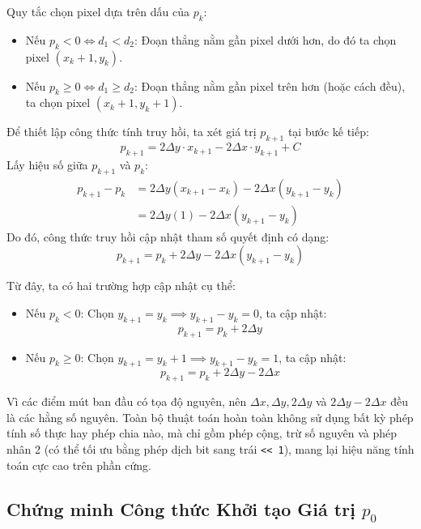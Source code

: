 Quy tắc chọn pixel dựa trên dấu của $p_k$:
\begin{itemize}
    \item Nếu $p_k < 0 \iff d_1 < d_2$: Đoạn thẳng nằm gần pixel dưới hơn, do đó ta chọn pixel $(x_k + 1, y_k)$.
    \item Nếu $p_k \ge 0 \iff d_1 \ge d_2$: Đoạn thẳng nằm gần pixel trên hơn (hoặc cách đều), ta chọn pixel $(x_k + 1, y_k + 1)$.
\end{itemize}

Để thiết lập công thức tính truy hồi, ta xét giá trị $p_{k+1}$ tại bước kế tiếp:
\begin{equation}
p_{k+1} = 2\Delta y \cdot x_{k+1} - 2\Delta x \cdot y_{k+1} + C
\end{equation}
Lấy hiệu số giữa $p_{k+1}$ và $p_k$:
\begin{align}
p_{k+1} - p_k &= 2\Delta y (x_{k+1} - x_k) - 2\Delta x (y_{k+1} - y_k) \nonumber \\
&= 2\Delta y (1) - 2\Delta x (y_{k+1} - y_k)
\end{align}
Do đó, công thức truy hồi cập nhật tham số quyết định có dạng:
\begin{equation}
p_{k+1} = p_k + 2\Delta y - 2\Delta x (y_{k+1} - y_k)
\end{equation}

Từ đây, ta có hai trường hợp cập nhật cụ thể:
\begin{itemize}
    \item Nếu $p_k < 0$: Chọn $y_{k+1} = y_k \implies y_{k+1} - y_k = 0$, ta cập nhật:
    \begin{equation}
    p_{k+1} = p_k + 2\Delta y
    \end{equation}
    \item Nếu $p_k \ge 0$: Chọn $y_{k+1} = y_k + 1 \implies y_{k+1} - y_k = 1$, ta cập nhật:
    \begin{equation}
    p_{k+1} = p_k + 2\Delta y - 2\Delta x
    \end{equation}
\end{itemize}

Vì các điểm mút ban đầu có tọa độ nguyên, nên $\Delta x, \Delta y, 2\Delta y$ và $2\Delta y - 2\Delta x$ đều là các hằng số nguyên. Toàn bộ thuật toán hoàn toàn không sử dụng bất kỳ phép tính số thực hay phép chia nào, mà chỉ gồm phép cộng, trừ số nguyên và phép nhân 2 (có thể tối ưu bằng phép dịch bit sang trái \texttt{<< 1}), mang lại hiệu năng tính toán cực cao trên phần cứng.

\subsection{Chứng minh Công thức Khởi tạo Giá trị \texorpdfstring{$p_0$}{p0}}

